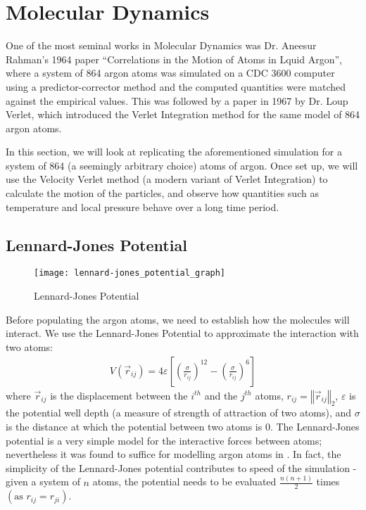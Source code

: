 \documentclass[../Main.tex]{subfiles}
\begin{document}
\section{Molecular Dynamics}

One of the most seminal works in Molecular Dynamics was Dr. Aneesur Rahman's 1964 paper \cite{Rahman1964} ``Correlations in the Motion of Atoms in Lquid Argon'', where a system of 864 argon atoms was simulated on a CDC 3600 computer using a predictor-corrector method and the computed quantities were matched against the empirical values. This was followed by a paper in 1967 \cite{Verlet1967} by Dr. Loup Verlet, which introduced the Verlet Integration method for the same model of 864 argon atoms.

In this section, we will look at replicating the aforementioned simulation for a system of 864 (a seemingly arbitrary choice) atoms of argon. Once set up, we will use the Velocity Verlet method (a modern variant of Verlet Integration) to calculate the motion of the particles, and observe how quantities such as temperature and local pressure behave over a long time period.

\subsection{Lennard-Jones Potential}

\begin{wrapfigure}{r}{0.5\textwidth}
\centering
\texttt{[image: lennard-jones\_potential\_graph]}
\caption{Lennard-Jones Potential}
\label{fig:lennard-jones_potential}
\end{wrapfigure}

Before populating the argon atoms, we need to establish how the molecules will interact. We use the Lennard-Jones Potential to approximate the interaction with two atoms:
\begin{align}
	V\left(\vec{r}_{ij}\right) = 4\varepsilon \left[ \left( \frac{\sigma}{r_{ij}}\right)^{12} - \left( \frac{\sigma}{r_{ij}}\right)^{6} \right] \label{eqn:lennard-jones_potential}
\end{align}
where $\vec{r}_{ij}$ is the displacement between the $i^{th}$ and the $j^{th}$ atoms, $r_{ij} = \left\Vert\vec{r}_{ij}\right\Vert_{2}$, $\varepsilon$ is the potential well depth (a measure of strength of attraction of two atoms), and $\sigma$ is the distance at which the potential between two atoms is 0. The Lennard-Jones potential is a very simple model for the interactive forces between atoms; nevertheless it was found to suffice for modelling argon atoms in \cite{Rahman1964}. In fact, the simplicity of the Lennard-Jones potential contributes to speed of the simulation - given a system of $n$ atoms, the potential needs to be evaluated $\frac{n\left(n+1\right)}{2}$ times $\left(\mbox{as }r_{ij} = r_{ji}\right)$.
\end{document}
